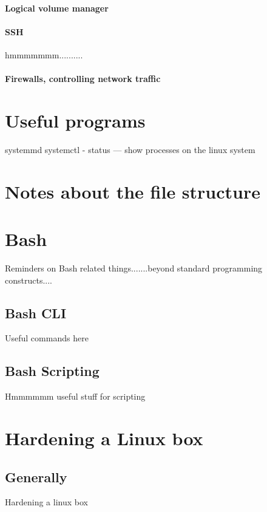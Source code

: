 \documentclass[a4paper, 11pt]{book}
\begin{document}
    \paragraph{Logical volume manager}

    \paragraph{SSH}
    hmmmmmmm..........

    \paragraph{Firewalls, controlling network traffic}


    \section{Useful programs}
    systemmd
    systemctl - status --- show processes on the linux system


    \section{Notes about the file structure}


    \section{Bash}
    Reminders on Bash related things.......beyond standard programming constructs....

    \subsection{Bash CLI}
    Useful commands here

    \subsection{Bash Scripting}
    Hmmmmmm useful stuff for scripting


    \section{Hardening a Linux box}

    \subsection{Generally}
    Hardening a linux box
\end{document}
